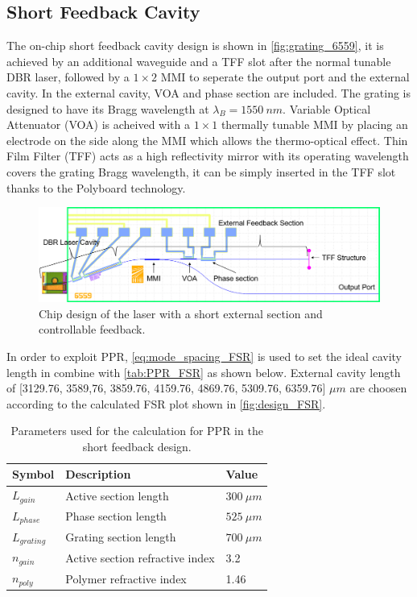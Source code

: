 \subsection{Short Feedback Cavity} \label{subsec:short_feedback_cavity}
The on-chip short feedback cavity design is shown in \autoref{fig:grating_6559}, it is achieved by an additional waveguide and a TFF slot after the normal tunable DBR laser, followed by a $1\times 2$ MMI to seperate the output port and the external cavity. In the external cavity, VOA and phase section are included. The grating is designed to have its Bragg wavelength at $\lambda_B=1550 \ nm$.  Variable Optical Attenuator (VOA) is acheived with a $1\times 1$  thermally tunable MMI by placing an electrode on the side along the MMI which allows the thermo-optical effect. Thin Film Filter (TFF) acts as a high reflectivity mirror with its operating wavelength covers the grating Bragg wavelength, it can be simply inserted in the TFF slot thanks to the Polyboard technology. 

\begin{figure}[H]
    \centering
    \includegraphics[width=\linewidth]{figures/6559_short_comment.png}
    \caption{Chip design of the laser with a short external section and controllable feedback.}
    \label{fig:grating_6559}
\end{figure}

In order to exploit PPR, \autoref{eq:mode_spacing_FSR} is used to set the ideal cavity length in combine with \autoref{tab:PPR_FSR} as shown below. External cavity length of [3129.76, 3589,76, 3859.76, 4159.76, 4869.76, 5309.76, 6359.76] $\mu m$ are choosen according to the calculated FSR plot shown in \autoref{fig:design_FSR}.

\begin{table}[ht]
    \centering
    \caption{Parameters used for the calculation for PPR in the short feedback design.}
    \label{tab:PPR_FSR}
    \begin{tabular}{@{}lll@{}}
    \toprule
    Symbol          & Description                      & Value             \\ \midrule
    $L_{gain}$      & Active section length            & $300 \ \mu m$     \\
    $L_{phase}$     & Phase section length             & $525 \ \mu m$     \\
    $L_{grating}$   & Grating section length           & $700 \ \mu m$     \\
    $n_{gain}$      & Active section refractive index  & 3.2               \\
    $n_{poly}$      & Polymer refractive index         & 1.46              \\
    \bottomrule
    \end{tabular}
\end{table}


